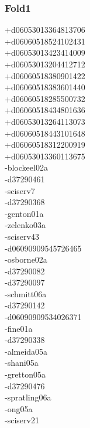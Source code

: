 \begin{multicols}{3}
\subsubsection*{Fold1}
+d06053013364813706\\
+d06060518524102431\\
+d06053013423414009\\
+d06053013204412712\\
+d06060518380901422\\
+d06060518383601440\\
+d06060518285500732\\
+d06060518434801636\\
+d06053013264113073\\
+d06060518443101648\\
+d06060518312200919\\
+d06053013360113675\\
-blockeel02a\\
-d37290461\\
-sciserv7\\
-d37290368\\
-genton01a\\
-zelenko03a\\
-sciserv43\\
-d06090909545726465\\
-osborne02a\\
-d37290082\\
-d37290097\\
-schmitt06a\\
-d37290142\\
-d06090909534026371\\
-fine01a\\
-d37290338\\
-almeida05a\\
-shani05a\\
-gretton05a\\
-d37290476\\
-spratling06a\\
-ong05a\\
-sciserv21\\

\end{multicols}
